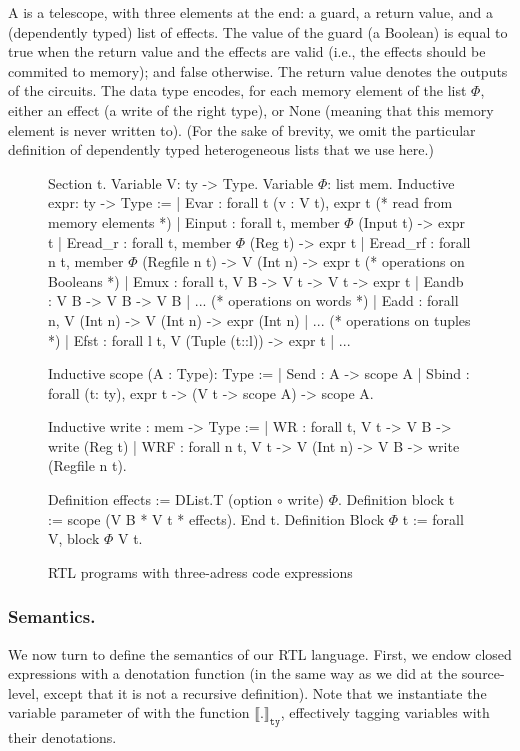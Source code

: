 \documentclass{llncs}
\newcommand{\denote}[1]{\llbracket #1 \rrbracket}
\newcommand{\denotety}[1]{\denote{\mathtt{#1}}_{\mathtt{ty}}}
\begin{document}
A  is a telescope, with three elements at the end: a
guard, a return value, and a (dependently typed) list of effects. 
%
The value of the guard (a Boolean) is equal to true when the
return value and the effects are valid (i.e., the effects should be
commited to memory); and false otherwise.
%
The return value denotes the outputs of the circuits. 
%
The data type  encodes, for each memory element of the
list $\Phi$, either an effect (a write of the right type), or None
(meaning that this memory element is never written to). (For the sake
of brevity, we omit the particular definition of dependently typed
heterogeneous lists  that we use here.)


\begin{figure}
  \centering
\begin{coq}
Section t. 
Variable V: ty -> Type. Variable $\Phi$: list mem. 
Inductive expr: ty -> Type :=
| Evar : forall t (v : V t), expr t
(* read from memory elements *)
| Einput : forall t, member $\Phi$ (Input t) -> expr t
| Eread_r : forall t, member $\Phi$ (Reg t) -> expr t
| Eread_rf : forall n t, member $\Phi$ (Regfile n t) -> V (Int n) -> expr t
(* operations on Booleans *)
| Emux : forall t, V B -> V t -> V t -> expr t
| Eandb : V B -> V B -> V B | ... 
(* operations on words *)
| Eadd : forall n, V (Int n) -> V (Int n) -> expr (Int n) | ... 
(* operations on tuples *)
| Efst : forall l t, V (Tuple (t::l)) -> expr t | ...

Inductive scope (A : Type): Type :=
| Send : A -> scope A
| Sbind : forall (t: ty), expr t -> (V t -> scope A) -> scope A. 

Inductive write : mem -> Type :=
| WR : forall t, V t -> V B -> write (Reg t)
| WRF : forall n t, V t -> V (Int n) -> V B ->  write (Regfile n t). 
     
Definition effects := DList.T (option $\circ$ write) $\Phi$. 
Definition block t := scope (V B * V t *  effects).         
End t.
Definition Block $\Phi$ t := forall V, block $\Phi$ V t.
\end{coq}
  \caption{RTL programs with three-adress code expressions}
  \label{fig:rtl}
\end{figure}

\subsubsection{Semantics.} We now turn to define the semantics of our RTL
language. 
%
First, we endow closed expressions with a denotation function (in the
same way as we did at the source-level, except that it is not a
recursive definition).
%
Note that we instantiate the variable parameter of  with
the function $\denotety{.}$, effectively tagging variables with their
denotations.
\end{document}
